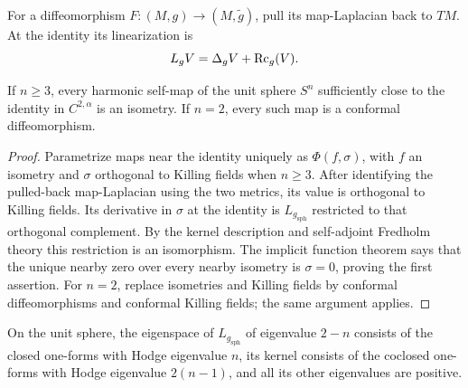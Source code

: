 For a diffeomorphism \(F:(M,g)\to(M,\widetilde g)\), pull its map-Laplacian
back to \(TM\).  At the identity its linearization is
\[
 L_gV=\Delta_gV+\operatorname{Rc}_g(V).
\]

\begin{proposition}
\label{prop:chow-iv-harmonic-sphere-map-near-identity}
If \(n\ge3\), every harmonic self-map of the unit sphere \(S^n\) sufficiently
close to the identity in \(C^{2,\alpha}\) is an isometry.  If \(n=2\), every
such map is a conformal diffeomorphism.
\end{proposition}
\begin{proof}
Parametrize maps near the identity uniquely as \(\Phi(f,\sigma)\), with \(f\)
an isometry and \(\sigma\) orthogonal to Killing fields when \(n\ge3\).  After
identifying the pulled-back map-Laplacian using the two metrics, its value is
orthogonal to Killing fields.  Its derivative in \(\sigma\) at the identity is
\(L_{g_{\mathrm{sph}}}\) restricted to that orthogonal complement.  By the
kernel description and self-adjoint Fredholm theory this restriction is an
isomorphism.  The implicit function theorem says that the unique nearby zero
over every nearby isometry is \(\sigma=0\), proving the first assertion.  For
\(n=2\), replace isometries and Killing fields by conformal diffeomorphisms and
conformal Killing fields; the same argument applies.
\end{proof}

\begin{remark}
\label{rem:chow-iv-sphere-map-laplacian-low-eigenspaces}
On the unit sphere, the eigenspace of \(L_{g_{\mathrm{sph}}}\) of eigenvalue
\(2-n\) consists of the closed one-forms with Hodge eigenvalue \(n\), its
kernel consists of the coclosed one-forms with Hodge eigenvalue \(2(n-1)\),
and all its other eigenvalues are positive.
\end{remark}

